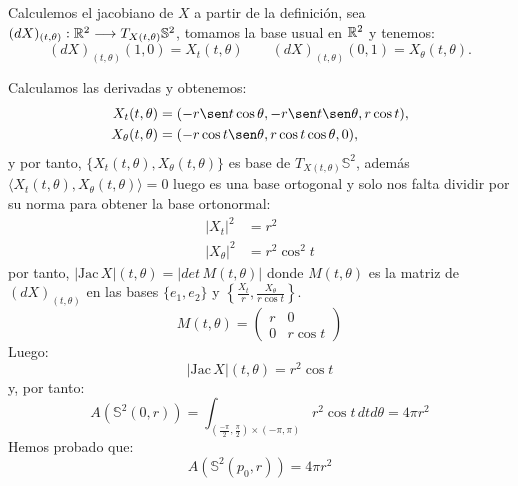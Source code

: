 \begin{remark}
Calculemos el jacobiano de $X$ a partir de la definición, sea $(dX)_{(t, \theta)}: \mathbb{R}^2 \longrightarrow T_{X(t,\theta)} \mathbb{S}^2$, tomamos la base usual en $\mathbb{R}^2$ y tenemos:
%
\begin{equation*}
    (dX)_{(t, \theta)}(1,0) = X_t(t, \theta) \qquad (dX)_{(t, \theta)}(0,1) = X_\theta(t, \theta).
\end{equation*}

Calculamos las derivadas y obtenemos:
%
\begin{align*}
    X_t(t, \theta) &= (-r\sen t\cos\theta, -r\sen t\sen\theta, r\cos t), \\
    X_\theta(t, \theta) &= (-r\cos t\sen\theta, r\cos t\cos\theta, 0),
\end{align*}
%
y por tanto, $\{ X_t(t, \theta), X_\theta(t, \theta) \}$ es base de $T_{X(t,\theta)} \mathbb{S}^2$, además $\langle X_t(t, \theta), X_\theta(t, \theta) \rangle = 0$ luego es una base ortogonal y solo nos falta dividir por su norma para obtener la base ortonormal:
%
\begin{align*}
    |X_t|^2 &= r^2 \\
    |X_\theta|^2 &= r^2\cos^2t
\end{align*}
%
por tanto, $|\text{Jac} \, X|(t,\theta) = |det \, M(t,\theta)|$  donde $M(t,\theta)$ es la matriz de $(dX)_{(t, \theta)}$ en las bases $\{e_1, e_2\}$ y $\left\{ \frac{X_t}{r}, \frac{X_\theta}{r\cos t} \right\}$.
%
\begin{equation*}
    M(t,\theta) = \left( {\begin{array}{cc}
        r & 0 \\
        0 & r\cos t
    \end{array} } \right)
\end{equation*}
%
Luego:
%
\begin{equation*}
    |\text{Jac} \, X|(t,\theta) = r^2\cos t
\end{equation*}
%
y, por tanto:
%
\begin{equation*}
    A(\mathbb{S}^2(0,r)) = \int_{(\frac{-\pi}{2}, \frac{\pi}{2}) \times (-\pi, \pi)} r^2\cos t \, dtd\theta = 4\pi r^2 
\end{equation*}
%
Hemos probado que:
\begin{equation*}
    A(\mathbb{S}^2(p_0,r)) = 4\pi r^2 
\end{equation*}
\end{remark}

